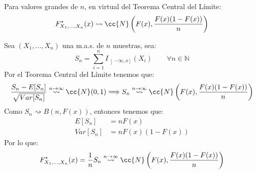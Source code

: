 \begin{ejercicio}
    Para valores grandes de $n$, en virtual del Teorema Central del Límite:
    \begin{equation*}
        F_{X_1, \ldots, X_n}^\ast (x) \rightsquigarrow \cc{N}\left(F(x), \dfrac{F(x)(1-F(x))}{n}\right)
    \end{equation*}

    \noindent
    Sea $(X_1, \ldots, X_n)$ una m.a.s. de $n$ muestras, sea:
    \begin{equation*}
        S_n = \sum_{i=1}^{n} I_{\left]-\infty,x\right]}(X_i) \qquad \forall n\in \mathbb{N}
    \end{equation*}
    Por el Teorema Central del Límite tenemos que:
    \begin{equation*}
        \dfrac{S_n - E[S_n]}{\sqrt{Var[S_n]}} \stackrel{n\to \infty}{\rightsquigarrow} \cc{N}(0,1) \Longrightarrow S_n \stackrel{n\to \infty}{\rightsquigarrow} \cc{N}\left(F(x), \dfrac{F(x)(1-F(x))}{n}\right)
    \end{equation*}
    Como $S_n \rightsquigarrow B(n,F(x))$, entonces tenemos que:
    \begin{align*}
        E[S_n] &= nF(x) \\
        Var[S_n] &= nF(x)(1-F(x))
    \end{align*}
    Por lo que:
    \begin{equation*}
        F_{X_1, \ldots, X_n}^\ast (x) = \dfrac{1}{n}S_n \stackrel{n\to \infty}{\rightsquigarrow} \cc{N}\left(F(x), \dfrac{F(x)(1-F(x))}{n}\right)
    \end{equation*}
\end{ejercicio}

